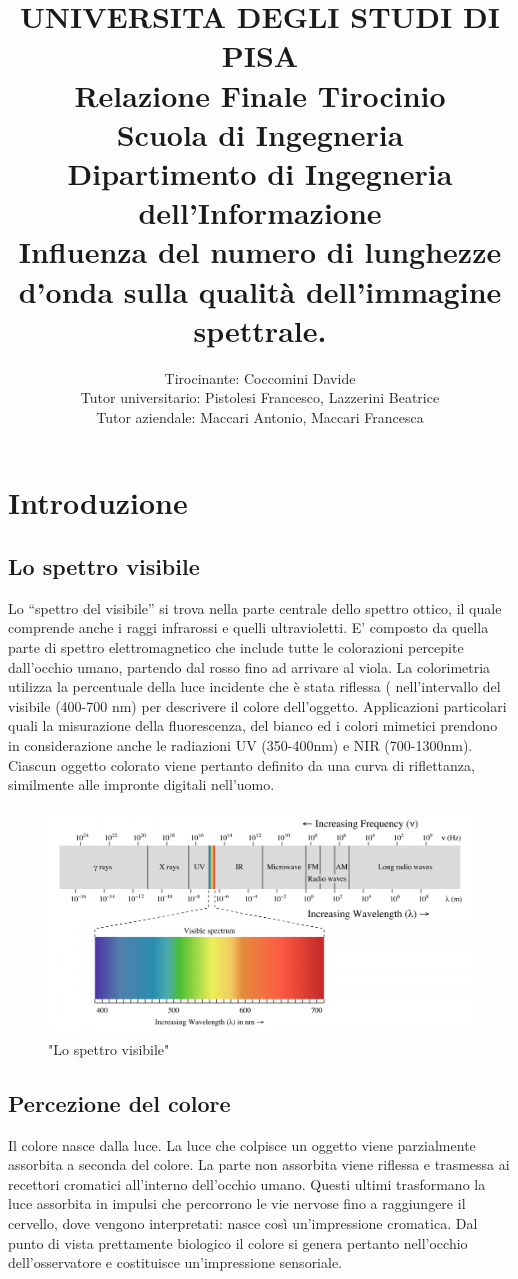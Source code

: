 \documentclass[a4paper,11pt]{article}
\author{
        Tirocinante: Coccomini Davide \\
        Tutor universitario: Pistolesi Francesco, Lazzerini Beatrice \\
        Tutor aziendale: Maccari Antonio, Maccari Francesca
    }
\title{\textbf{UNIVERSITA DEGLI STUDI DI PISA} \\[0.4in]
        Relazione Finale Tirocinio \\
    Scuola di Ingegneria \\
    Dipartimento di Ingegneria dell’Informazione \\[1in]
    Influenza del numero di lunghezze d’onda sulla qualità dell’immagine spettrale.}
\date{}
\begin{document}
    \maketitle  
    \newpage
        \tableofcontents
        \newpage
        \section{Introduzione}
        \subsection{Lo spettro visibile}
        Lo “spettro del visibile” si trova nella parte centrale dello spettro ottico, il quale
        comprende anche i raggi infrarossi e quelli ultravioletti. E’ composto da quella parte di
        spettro elettromagnetico che include tutte le colorazioni percepite dall’occhio umano,
        partendo dal rosso fino ad arrivare al viola.
        La colorimetria utilizza la percentuale della luce incidente che è stata riflessa (%
        nell'intervallo del visibile (400-700 nm) per descrivere il colore dell'oggetto. Applicazioni
        particolari quali la misurazione della fluorescenza, del bianco ed i colori mimetici prendono in
        considerazione anche le radiazioni UV (350-400nm) e NIR (700-1300nm). Ciascun oggetto
        colorato viene pertanto definito da una curva di riflettanza, similmente alle impronte digitali
        nell’uomo. 
        \begin{figure}[h]
            \centering
            \includegraphics[scale=0.3]{colorimetria3}
            \caption{"Lo spettro visibile"}
        \end{figure}
        \newpage
        \subsection{Percezione del colore}
        Il colore nasce dalla luce. La luce che colpisce un oggetto viene parzialmente assorbita a
        seconda del colore. La parte non assorbita viene riflessa e trasmessa ai recettori cromatici
        all’interno dell’occhio umano. Questi ultimi trasformano la luce assorbita in impulsi che
        percorrono le vie nervose fino a raggiungere il cervello, dove vengono interpretati: nasce così
        un’impressione cromatica. Dal punto di vista prettamente biologico il colore si genera pertanto
        nell’occhio dell’osservatore e costituisce un’impressione sensoriale.
\end{document}
